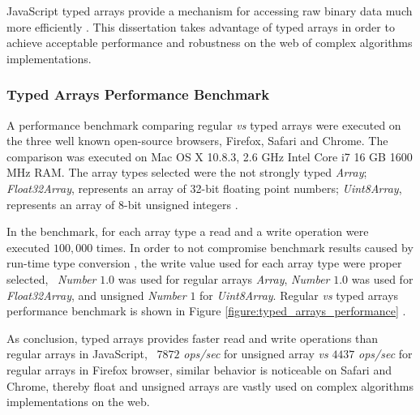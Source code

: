 JavaScript typed arrays provide a mechanism for accessing raw binary data much more efficiently \cite{MDN2013,TypedArray2013}. This dissertation takes advantage of typed arrays in order to achieve acceptable performance and robustness on the web of complex algorithms implementations.

\subsubsection{Typed Arrays Performance Benchmark} %
\label{subsub:basic_concepts:web:javascript_typed_arrays:typed_arrays_performance_benchmark}

A performance benchmark comparing regular \textit{vs} typed arrays were executed on the three well known open-source browsers, Firefox, Safari and Chrome. The comparison was executed on Mac OS X 10.8.3, 2.6 GHz Intel Core i7 16 GB 1600 MHz RAM. The array types selected were the not strongly typed \textit{Array}; \textit{Float32Array}, represents an array of 32-bit floating point numbers; \textit{Uint8Array}, represents an array of 8-bit unsigned integers \cite{MDN2013}.

In the benchmark, for each array type a read and a write operation were executed $100,000$ times. In order to not compromise benchmark results caused by run-time type conversion \cite{International2009}, the write value used for each array type were proper selected, \eg\ \textit{Number} $1.0$ was used for regular arrays \textit{Array}, \textit{Number} $1.0$ was used for \textit{Float32Array}, and unsigned \textit{Number} $1$ for \textit{Uint8Array}. Regular \textit{vs} typed arrays performance benchmark is shown in Figure \ref{figure:typed_arrays_performance} \cite{TypedArrayPerformance2013}.

As conclusion, typed arrays provides faster read and write operations than regular arrays in JavaScript, \ie\ $7872$ \textit{ops/sec} for unsigned array \textit{vs} $4437$ \textit{ops/sec} for regular arrays in Firefox browser, similar behavior is noticeable on Safari and Chrome, thereby float and unsigned arrays are vastly used on complex algorithms implementations on the web.

